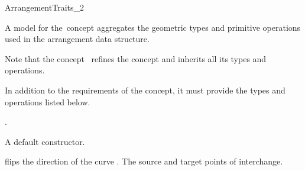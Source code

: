 
\ccRefPageBegin

\begin{ccRefConcept}{ArrangementTraits_2}

\ccDefinition
A model for the\ccRefName\ concept aggregates the geometric types and
primitive operations used in the arrangement
 data structure.

Note that the concept \ccRefName\ refines the concept
 and inherits all its types and
operations.

In addition to the requirements of the 
concept, it must provide the types and operations listed below.

\ccRefines
{}
.


\ccCreation
    
{A default constructor.}

\ccOperations
{}
         {flips the direction of the curve . The source and target
          points of  interchange.}

\ccHasModels
  \\
  \\
  \\
   \\
   \\

\end{ccRefConcept}

\ccRefPageEnd
